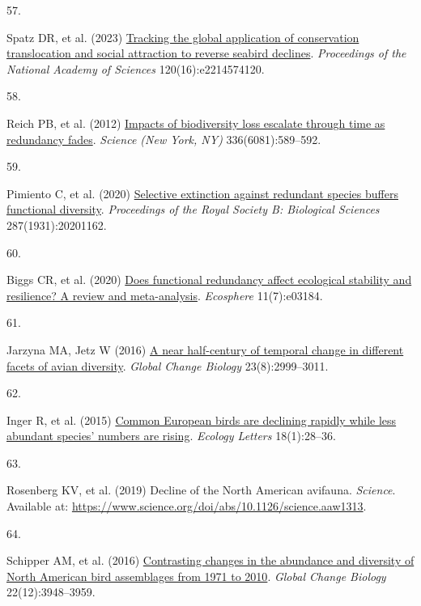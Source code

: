 \documentclass{article}
\newlength{\cslhangindent}
\newlength{\csllabelwidth}
\newlength{\cslentryspacingunit} %
\newenvironment{CSLReferences}[2] %
 {%
  \setlength{\parindent}{0pt}
  \ifodd #1
  \let\oldpar\par
  \def\par{\hangindent=\cslhangindent\oldpar}
  \fi
  \setlength{\parskip}{#2\cslentryspacingunit}
 }%
 {}
\newcommand{\CSLLeftMargin}[1]{\parbox[t]{\csllabelwidth}{#1}}
\newcommand{\CSLRightInline}[1]{\parbox[t]{\linewidth - \csllabelwidth}{#1}\break}
\begin{document}
\begin{CSLReferences}{0}{0}
\leavevmode{}%
\CSLLeftMargin{57. }%
\CSLRightInline{Spatz DR, et al. (2023)
\href{https://doi.org/10.1073/pnas.2214574120}{Tracking the global
application of conservation translocation and social attraction to
reverse seabird declines}. \emph{Proceedings of the National Academy of
Sciences} 120(16):e2214574120.}

\leavevmode{}%
\CSLLeftMargin{58. }%
\CSLRightInline{Reich PB, et al. (2012)
\href{https://doi.org/10.1126/science.1217909}{Impacts of biodiversity
loss escalate through time as redundancy fades}. \emph{Science (New
York, NY)} 336(6081):589--592.}

\leavevmode{}%
\CSLLeftMargin{59. }%
\CSLRightInline{Pimiento C, et al. (2020)
\href{https://doi.org/10.1098/rspb.2020.1162}{Selective extinction
against redundant species buffers functional diversity}.
\emph{Proceedings of the Royal Society B: Biological Sciences}
287(1931):20201162.}

\leavevmode{}%
\CSLLeftMargin{60. }%
\CSLRightInline{Biggs CR, et al. (2020)
\href{https://doi.org/10.1002/ecs2.3184}{Does functional redundancy
affect ecological stability and resilience? A review and meta-analysis}.
\emph{Ecosphere} 11(7):e03184.}

\leavevmode{}%
\CSLLeftMargin{61. }%
\CSLRightInline{Jarzyna MA, Jetz W (2016)
\href{https://doi.org/10.1111/gcb.13571}{A near half-century of temporal
change in different facets of avian diversity}. \emph{Global Change
Biology} 23(8):2999--3011.}

\leavevmode{}%
\CSLLeftMargin{62. }%
\CSLRightInline{Inger R, et al. (2015)
\href{https://doi.org/10.1111/ele.12387}{Common European birds are
declining rapidly while less abundant species' numbers are rising}.
\emph{Ecology Letters} 18(1):28--36.}

\leavevmode{}%
\CSLLeftMargin{63. }%
\CSLRightInline{Rosenberg KV, et al. (2019) Decline of the North
American avifauna. \emph{Science}. Available at:
\url{https://www.science.org/doi/abs/10.1126/science.aaw1313}.}

\leavevmode{}%
\CSLLeftMargin{64. }%
\CSLRightInline{Schipper AM, et al. (2016)
\href{https://doi.org/10.1111/gcb.13292}{Contrasting changes in the
abundance and diversity of North American bird assemblages from 1971 to
2010}. \emph{Global Change Biology} 22(12):3948--3959.}


\end{CSLReferences}
\end{document}
